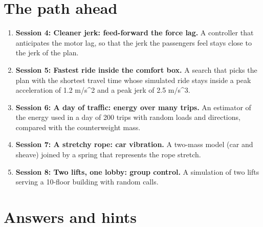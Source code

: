 \documentclass[11pt,a4paper]{article}
\begin{document}
\section{The path ahead}
\begin{enumerate}[nosep]
\item \textbf{Session 4: Cleaner jerk: feed-forward the force lag.} A controller that anticipates the motor lag, so that the jerk the passengers feel stays close to the jerk of the plan.
\item \textbf{Session 5: Fastest ride inside the comfort box.} A search that picks the plan with the shortest travel time whose simulated ride stays inside a peak acceleration of 1.2 m/s\textasciicircum{}2 and a peak jerk of 2.5 m/s\textasciicircum{}3.
\item \textbf{Session 6: A day of traffic: energy over many trips.} An estimator of the energy used in a day of 200 trips with random loads and directions, compared with the counterweight mass.
\item \textbf{Session 7: A stretchy rope: car vibration.} A two-mass model (car and sheave) joined by a spring that represents the rope stretch.
\item \textbf{Session 8: Two lifts, one lobby: group control.} A simulation of two lifts serving a 10-floor building with random calls.
\end{enumerate}

\section{Answers and hints}
\end{document}
